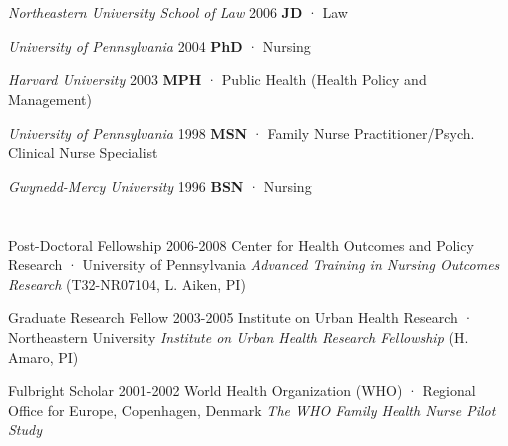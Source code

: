 \documentclass[10pt,]{article}
\begin{document}
\section{\Large {}}
{\textit {Northeastern University School of Law} \hfill 2006 \newline
\hspace*{0.5cm} {\textbf {JD}} · Law

{\textit {University of Pennsylvania} \hfill 2004 \newline
\hspace*{0.5cm} {\textbf {PhD}} · Nursing 

{\textit {Harvard University}  \hfill	2003 \newline
\hspace*{0.5cm} {\textbf {MPH}} · Public Health (Health Policy and Management)
	
{\textit {University of Pennsylvania} \hfill 1998 \newline
\hspace*{0.5cm} {\textbf {MSN}} · Family Nurse Practitioner/Psych. Clinical Nurse Specialist

{\textit {Gwynedd-Mercy University} \hfill	1996 \newline
\hspace*{0.5cm} {\textbf {BSN}} · Nursing \newline

\section{\Large {}}

Post-Doctoral Fellowship \hfill 2006-2008 \newline
Center for Health Outcomes and Policy Research · University of Pennsylvania  \newline
\hspace*{0.5cm} {\textit {Advanced Training in Nursing Outcomes Research}} (T32-NR07104, L. Aiken, PI)
 
Graduate Research Fellow \hfill 2003-2005 \newline
Institute on Urban Health Research · Northeastern University  \newline
\hspace*{0.5cm} {\textit {Institute on Urban Health Research Fellowship}} (H. Amaro, PI)

Fulbright Scholar \hfill 2001-2002 \newline
World Health Organization (WHO) · Regional Office for Europe, Copenhagen, Denmark  \newline
\hspace*{0.5cm} {\textit {The WHO Family Health Nurse Pilot Study}}

}}}}}
\end{document}
